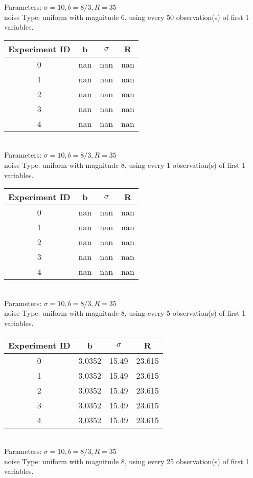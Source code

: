 \begin{multicols}{3}
Parameters: $\sigma=10, b=8/3, R=35$\\
noise Type: uniform with magnitude 6, using every 50 observation(s) of first 1 variables.\\
\begin{tabular}{cccc}
\hline Experiment ID & b & $\sigma$ & R \\ \hline 
0 & nan & nan & nan\\ \hline 
 1 & nan & nan & nan\\ \hline 
 2 & nan & nan & nan\\ \hline 
 3 & nan & nan & nan\\ \hline 
 4 & nan & nan & nan\\ \hline 
 \end{tabular}\\
Parameters: $\sigma=10, b=8/3, R=35$\\
noise Type: uniform with magnitude 8, using every 1 observation(s) of first 1 variables.\\
\begin{tabular}{cccc}
\hline Experiment ID & b & $\sigma$ & R \\ \hline 
0 & nan & nan & nan\\ \hline 
 1 & nan & nan & nan\\ \hline 
 2 & nan & nan & nan\\ \hline 
 3 & nan & nan & nan\\ \hline 
 4 & nan & nan & nan\\ \hline 
 \end{tabular}\\
Parameters: $\sigma=10, b=8/3, R=35$\\
noise Type: uniform with magnitude 8, using every 5 observation(s) of first 1 variables.\\
\begin{tabular}{cccc}
\hline Experiment ID & b & $\sigma$ & R \\ \hline 
0 & 3.0352 & 15.49 & 23.615\\ \hline 
 1 & 3.0352 & 15.49 & 23.615\\ \hline 
 2 & 3.0352 & 15.49 & 23.615\\ \hline 
 3 & 3.0352 & 15.49 & 23.615\\ \hline 
 4 & 3.0352 & 15.49 & 23.615\\ \hline 
 \end{tabular}\\
Parameters: $\sigma=10, b=8/3, R=35$\\
noise Type: uniform with magnitude 8, using every 25 observation(s) of first 1 variables.\\

\end{multicols}
